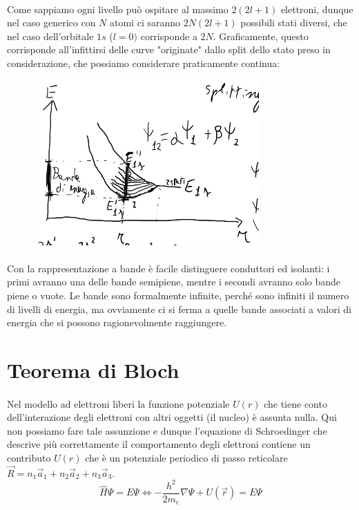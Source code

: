 \documentclass{book}
\begin{document}
        \paragraph{}
            Come sappiamo ogni livello può ospitare al massimo $2(2l+1)$ elettroni, dunque nel caso generico con $N$ atomi ci saranno $2N(2l+1)$ possibili stati diversi, che nel caso dell'orbitale $1s$ ($l=0)$ corrisponde a $2N$. Graficamente, questo corrisponde all'infittirsi delle curve "originate" dallo split dello stato preso in considerazione, che possiamo considerare praticamente continua:
            \begin{figure}[h!]
                \centering
                \includegraphics[width=0.5\linewidth]{img/Splitting3.png}
                \label{fig:Splitting3}
            \end{figure}
            \paragraph{} Con la rappresentazione a bande è facile distinguere conduttori ed isolanti: i primi avranno una delle bande semipiene, mentre i secondi avranno solo bande piene o vuote. Le bande sono formalmente infinite, perché sono infiniti il numero di livelli di energia, ma ovviamente ci si ferma a quelle bande associati a valori di energia che si possono ragionevolmente raggiungere.
    \section{Teorema di Bloch}
        \paragraph{} Nel modello ad elettroni liberi la funzione potenziale $U(r)$ che tiene conto dell'interazione degli elettroni con altri oggetti (il nucleo) è assunta nulla. Qui non possiamo fare tale assunzione e dunque l'equazione di Schroedinger che descrive più correttamente il comportamento degli elettroni contiene un contributo $U(r)$ che è un potenziale periodico di passo reticolare $\vec{R}=n_{1}\vec{a}_{1}+n_{2}\vec{a}_{2}+n_{3}\vec{a}_{3}$.
        $$\hat{H}\Psi = E \Psi \iff - \frac{h^{2}}{2m_{e}} \nabla \Psi + U(\vec{r}) = E \Psi$$
\end{document}
